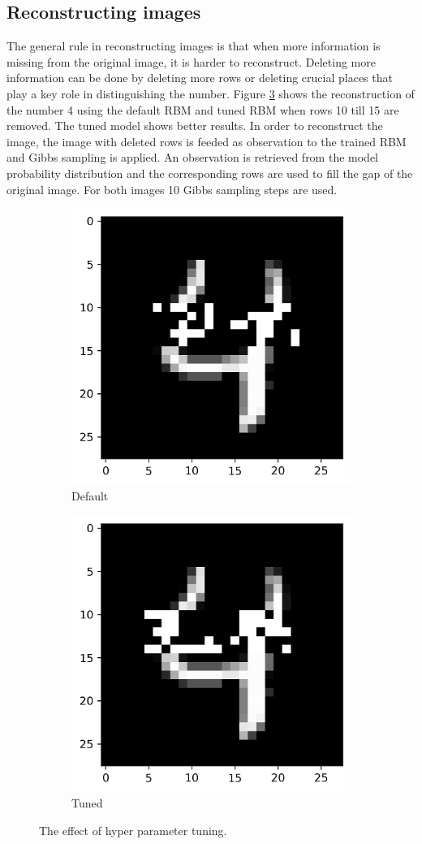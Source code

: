 \documentclass[a4paper,10pt]{article}
\begin{document}
\subsection{Reconstructing images}
The general rule in reconstructing images is that when more information is missing from the original image, it is harder to reconstruct. Deleting more information can be done by deleting more rows or deleting crucial places that play a key role in distinguishing the number. Figure \ref{fig:hyperpara} shows the reconstruction of the number 4 using the default RBM and tuned RBM when rows 10 till 15 are removed. The tuned model shows better results. In order to reconstruct the image, the image with deleted rows is feeded as observation to the trained RBM and Gibbs sampling is applied. An observation is retrieved from the model probability distribution and the corresponding rows are used to fill the gap of the original image. For both images 10 Gibbs sampling steps are used.

\begin{figure}[h]
	\begin{subfigure}{0.49\textwidth}
		\centering
		\includegraphics[width=0.4\linewidth]{default.png}
		\caption{Default}
		\label{fig:default}
	\end{subfigure}	 	
	\begin{subfigure}{0.49\textwidth}
		\centering
		\includegraphics[width=0.4\linewidth]{tuned.png}
		\caption{Tuned}
		\label{fig:tuned}
	\end{subfigure}	
	\caption{The effect of hyper parameter tuning.}
	\label{fig:hyperpara}
\end{figure}
\end{document}
